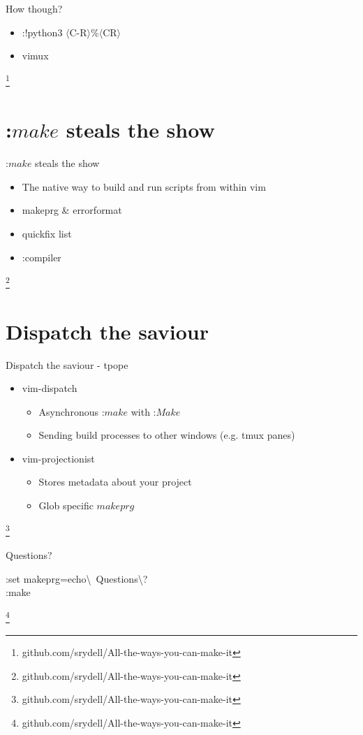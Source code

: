 \documentclass[12pt]{beamer}
\newcommand\blfootnote[1]{%
  \begingroup
  \renewcommand\thefootnote{}\footnote{#1}%
  \addtocounter{footnote}{-1}%
  \endgroup
}
\begin{document}
\begin{frame}{How though?}
    \begin{itemize}
        \item :!python3 $\langle$C-R$\rangle\%\langle$CR$\rangle$
        \item vimux
    \end{itemize}
    \blfootnote{github.com/srydell/All-the-ways-you-can-make-it}
\end{frame}

\section{:$make$ steals the show}

\begin{frame}{:$make$ steals the show}
    \begin{itemize}
        \item The native way to build and run scripts from within vim
        \item makeprg \& errorformat
        \item quickfix list
        \item :compiler
    \end{itemize}
    \blfootnote{github.com/srydell/All-the-ways-you-can-make-it}
\end{frame}

\section{Dispatch the saviour}

\begin{frame}{Dispatch the saviour - tpope}
     \begin{itemize}
         \item vim-dispatch
         \begin{itemize}
             \item Asynchronous :$make$ with :$Make$
             \item Sending build processes to other windows (e.g. tmux panes)
         \end{itemize}
         \item vim-projectionist
         \begin{itemize}
             \item Stores metadata about your project
             \item Glob specific $makeprg$
         \end{itemize}
     \end{itemize}
     \blfootnote{github.com/srydell/All-the-ways-you-can-make-it}
\end{frame}

\begin{frame}{Questions?}
     \begin{center}
         \large :set makeprg=echo\textbackslash \ Questions\textbackslash?\\
         \LARGE :make
     \end{center}
     \blfootnote{github.com/srydell/All-the-ways-you-can-make-it}
\end{frame}
\end{document}
